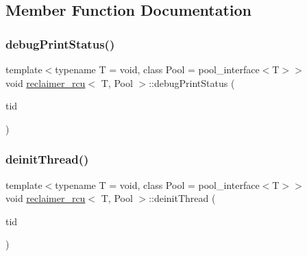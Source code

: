 \subsection{Member Function Documentation}
\mbox{\label{classreclaimer__rcu_aecc8947fd089984a2459b34d712f484f}} 
\subsubsection{\texorpdfstring{debug\+Print\+Status()}{debugPrintStatus()}}
{\footnotesize\ttfamily template$<$typename T  = void, class Pool  = pool\+\_\+interface$<$\+T$>$$>$ \\
void \hyperlink{classreclaimer__rcu}{reclaimer\+\_\+rcu}$<$ T, Pool $>$\+::debug\+Print\+Status (\begin{DoxyParamCaption}\item[{const int}]{tid }\end{DoxyParamCaption})\hspace{0.3cm}{\ttfamily [inline]}}

\mbox{\label{classreclaimer__rcu_a3a294a5b1a496cdd531a90f14e3ad708}} 
\subsubsection{\texorpdfstring{deinit\+Thread()}{deinitThread()}}
{\footnotesize\ttfamily template$<$typename T  = void, class Pool  = pool\+\_\+interface$<$\+T$>$$>$ \\
void \hyperlink{classreclaimer__rcu}{reclaimer\+\_\+rcu}$<$ T, Pool $>$\+::deinit\+Thread (\begin{DoxyParamCaption}\item[{const int}]{tid }\end{DoxyParamCaption})\hspace{0.3cm}{\ttfamily [inline]}}

\mbox{\label{classreclaimer__rcu_aab06e2ef6aeb6bd863b4bbecb121229f}} 
